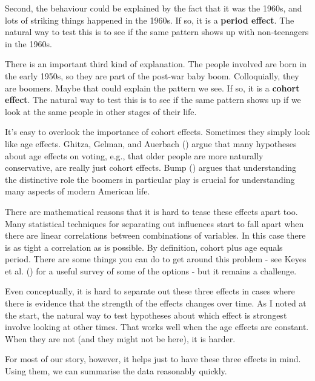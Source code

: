 \documentclass[
  12pt,
  letterpaper,
  DIV=11,
  numbers=noendperiod]{scrartcl}
\begin{document}
Second, the behaviour could be explained by the fact that it was the
1960s, and lots of striking things happened in the 1960s. If so, it is a
\textbf{period effect}. The natural way to test this is to see if the
same pattern shows up with non-teenagers in the 1960s.

There is an important third kind of explanation. The people involved are
born in the early 1950s, so they are part of the post-war baby boom.
Colloquially, they are boomers. Maybe that could explain the pattern we
see. If so, it is a \textbf{cohort effect}. The natural way to test this
is to see if the same pattern shows up if we look at the same people in
other stages of their life.

It's easy to overlook the importance of cohort effects. Sometimes they
simply look like age effects. Ghitza, Gelman, and Auerbach
() argue that many hypotheses about
age effects on voting, e.g., that older people are more naturally
conservative, are really just cohort effects. Bump
() argues that understanding the
distinctive role the boomers in particular play is crucial for
understanding many aspects of modern American life.

There are mathematical reasons that it is hard to tease these effects
apart too. Many statistical techniques for separating out influences
start to fall apart when there are linear correlations between
combinations of variables. In this case there is as tight a correlation
as is possible. By definition, cohort plus age equals period. There are
some things you can do to get around this problem - see Keyes et al.
() for a useful survey of some of the
options - but it remains a challenge.

Even conceptually, it is hard to separate out these three effects in
cases where there is evidence that the strength of the effects changes
over time. As I noted at the start, the natural way to test hypotheses
about which effect is strongest involve looking at other times. That
works well when the age effects are constant. When they are not (and
they might not be here), it is harder.

For most of our story, however, it helps just to have these three
effects in mind. Using them, we can summarise the data reasonably
quickly.
\end{document}
